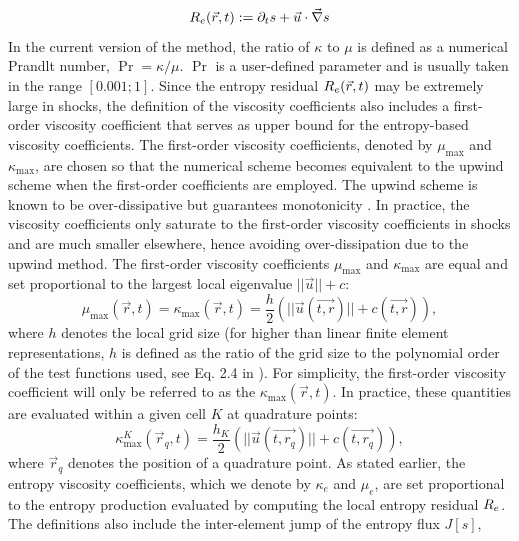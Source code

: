 %
\begin{equation}
\label{eq:ent_residual}
R_e(\vec{r}, t) := \partial_t s + \vec{u} \cdot \vec{\nabla} s
\end{equation}
%
In the current version of the method, the ratio of $\kappa$ to $\mu$ is defined as a numerical Prandlt number, $\Pr = \kappa / \mu$.  $\Pr$ is a user-defined parameter and is usually taken in the range $[ 0.001; 1 ]$. Since the entropy residual $R_e(\vec{r},t)$ may be extremely large in shocks, the definition of the viscosity coefficients also includes a first-order viscosity coefficient that serves as upper bound for the entropy-based viscosity coefficients. The first-order viscosity coefficients, denoted by $\mu_{\max}$ and $\kappa_{\max}$, are chosen so that the numerical scheme becomes equivalent to the upwind scheme when the first-order coefficients are employed. The upwind scheme is known to be over-dissipative but guarantees monotonicity \cite{Toro}. In practice, the viscosity coefficients only saturate to the first-order viscosity coefficients in shocks and are much smaller elsewhere, hence avoiding over-dissipation due to the upwind method.  The first-order viscosity coefficients $\mu_{\max}$ and $\kappa_{\max}$ are equal and set proportional to the largest local eigenvalue $|| \vec{u} || + c $:
%
\begin{equation}
\label{eq:fo}
\mu_{\max}(\vec{r}, t) = \kappa_{\max}(\vec{r}, t) = \frac{h}{2} \left( || \vec{u}(\vec{t,r}) || + c(\vec{t,r}) \right),
\end{equation}
%
where $h$ denotes the local grid size (for higher than linear finite element representations, $h$ is defined as the ratio of the grid size to the polynomial order of the test functions used, see Eq. 2.4 in \cite{valentin}). For simplicity, the first-order viscosity coefficient will only be referred to as the $\kappa_{\max}(\vec{r}, t)$. In practice, these quantities are evaluated within a given cell $K$ at quadrature points:
%
\begin{equation}
\label{eq:fo_quad}
\kappa^K_{\max}(\vec{r}_q, t) = \frac{h_K}{2} \left( || \vec{u}(\vec{t,r_q}) || + c(\vec{t,r_q}) \right),
\end{equation}
%
where $\vec{r}_q$ denotes the position of a quadrature point.
As stated earlier, the entropy viscosity coefficients, which we denote by $\kappa_e$ and $\mu_e$, are set proportional to the entropy production evaluated by computing the local entropy residual $R_e$. The definitions also include the inter-element jump of the entropy flux $J[s]$, %
